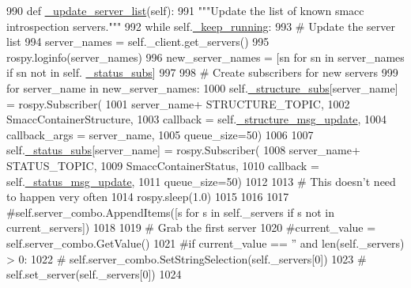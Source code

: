 \begin{DoxyCode}
990     \textcolor{keyword}{def }\hyperlink{classsmacc__viewer_1_1SmaccViewerFrame_a628e18936213355fab4eb60fbb35ae09}{\_update\_server\_list}(self):
991         \textcolor{stringliteral}{"""Update the list of known smacc introspection servers."""}
992         \textcolor{keywordflow}{while} self.\hyperlink{classsmacc__viewer_1_1SmaccViewerFrame_a20aa5e983200d5e77d659780d490d285}{\_keep\_running}:
993             \textcolor{comment}{# Update the server list}
994             server\_names = self.\_client.get\_servers()
995             rospy.loginfo(server\_names)
996             new\_server\_names = [sn \textcolor{keywordflow}{for} sn \textcolor{keywordflow}{in} server\_names \textcolor{keywordflow}{if} sn \textcolor{keywordflow}{not} \textcolor{keywordflow}{in} self.
      \hyperlink{classsmacc__viewer_1_1SmaccViewerFrame_aa5b8451546ae5f2048b30670dada3ac4}{\_status\_subs}]
997 
998             \textcolor{comment}{# Create subscribers for new servers}
999             \textcolor{keywordflow}{for} server\_name \textcolor{keywordflow}{in} new\_server\_names:
1000                 self.\hyperlink{classsmacc__viewer_1_1SmaccViewerFrame_aed30d68f7aa8ba4a422da87216e4ef5a}{\_structure\_subs}[server\_name] = rospy.Subscriber(
1001                         server\_name+ STRUCTURE\_TOPIC,
1002                         SmaccContainerStructure,
1003                         callback = self.\hyperlink{classsmacc__viewer_1_1SmaccViewerFrame_a6109f62a87363f5254173cbb1467bcc8}{\_structure\_msg\_update},
1004                         callback\_args = server\_name,
1005                         queue\_size=50)
1006 
1007                 self.\hyperlink{classsmacc__viewer_1_1SmaccViewerFrame_aa5b8451546ae5f2048b30670dada3ac4}{\_status\_subs}[server\_name] = rospy.Subscriber(
1008                         server\_name+ STATUS\_TOPIC,
1009                         SmaccContainerStatus,
1010                         callback = self.\hyperlink{classsmacc__viewer_1_1SmaccViewerFrame_af5e341bd874c8402738aec02cc598cca}{\_status\_msg\_update},
1011                         queue\_size=50)
1012 
1013             \textcolor{comment}{# This doesn't need to happen very often}
1014             rospy.sleep(1.0)
1015             
1016             
1017             \textcolor{comment}{#self.server\_combo.AppendItems([s for s in self.\_servers if s not in current\_servers])}
1018 
1019             \textcolor{comment}{# Grab the first server}
1020             \textcolor{comment}{#current\_value = self.server\_combo.GetValue()}
1021             \textcolor{comment}{#if current\_value == '' and len(self.\_servers) > 0:}
1022             \textcolor{comment}{#    self.server\_combo.SetStringSelection(self.\_servers[0])}
1023             \textcolor{comment}{#    self.set\_server(self.\_servers[0])}
1024 
\end{DoxyCode}


